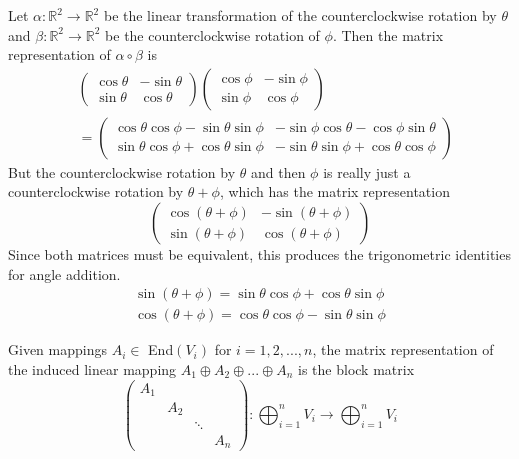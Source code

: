 \documentclass{article}
\begin{document}
    \begin{example}
      Let $\alpha: \mathbb{R}^2 \longrightarrow \mathbb{R}^2$ be the linear transformation of the counterclockwise rotation by $\theta$ and $\beta: \mathbb{R}^2 \longrightarrow \mathbb{R}^2$ be the counterclockwise rotation of $\phi$. Then the matrix representation of $\alpha \circ \beta$ is 
      \begin{align}
          & \begin{pmatrix}
        \cos{\theta} & - \sin{\theta} \\
        \sin{\theta} & \cos{\theta}
        \end{pmatrix} \begin{pmatrix}
        \cos{\phi} & - \sin{\phi} \\
        \sin{\phi} & \cos{\phi} 
        \end{pmatrix} \\
         & = \begin{pmatrix}
        \cos{\theta} \cos{\phi} - \sin{\theta} \sin{\phi} & - \sin{\phi} \cos{\theta} - \cos{\phi} \sin{\theta} \\
        \sin{\theta} \cos{\phi} + \cos{\theta} \sin{\phi} & - \sin{\theta} \sin{\phi} + \cos{\theta} \cos{\phi}
        \end{pmatrix}
      \end{align}
      But the counterclockwise rotation by $\theta$ and then $\phi$ is really just a counterclockwise rotation by $\theta + \phi$, which has the matrix representation
      \begin{equation}
        \begin{pmatrix}
        \cos{(\theta + \phi)} & - \sin{(\theta + \phi)} \\
        \sin{(\theta + \phi)} & \cos{(\theta + \phi)}
        \end{pmatrix}
      \end{equation}
      Since both matrices must be equivalent, this produces the trigonometric identities for angle addition.
      \begin{align*}
        \sin{(\theta + \phi)} = \sin{\theta} \cos{\phi} + \cos{\theta} \sin{\phi} \\
        \cos{(\theta + \phi)} = \cos{\theta} \cos{\phi} - \sin{\theta} \sin{\phi}
      \end{align*}
    \end{example}

    \begin{proposition}
      Given mappings $A_i \in$ End$(V_i)$ for $i = 1, 2, ..., n$, the matrix representation of the induced linear mapping $A_1 \oplus A_2 \oplus ... \oplus A_n$ is the block matrix 
      \begin{equation}
        \begin{pmatrix}
        A_1 & & & \\
        & A_2 & & \\
        & & \ddots & \\
        & & & A_n
        \end{pmatrix}: \bigoplus_{i=1}^n V_i \longrightarrow \bigoplus_{i=1}^n V_i
      \end{equation}
    \end{proposition}
\end{document}
